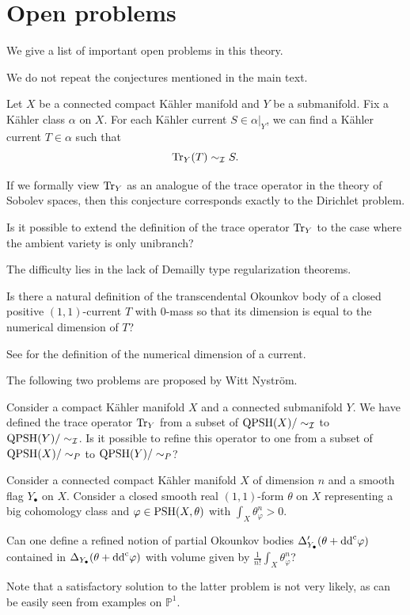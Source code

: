 \section*{Open problems}
We give a list of important open problems in this theory.

We do not repeat the conjectures mentioned in the main text.

\begin{conjecture}\label{conj:exttracegeneral}
    Let $X$ be a connected compact K\"ahler manifold and $Y$ be a submanifold. Fix a K\"ahler class $\alpha$ on $X$. For each K\"ahler current $S\in \alpha|_Y$, we can find a K\"ahler current $T\in \alpha$ such that
    \[
    \operatorname{Tr}_Y(T)\sim_{\mathcal{I}}S.
    \]
\end{conjecture}
If we formally view $\operatorname{Tr}_Y$ as an analogue of the trace operator in the theory of Sobolev spaces, then this conjecture corresponds exactly to the Dirichlet problem.

\begin{problem}\label{prob:history:L209}
    Is it possible to extend the definition of the trace operator $\operatorname{Tr}_Y$ to the case where the ambient variety is only unibranch?
\end{problem}
The difficulty lies in the lack of Demailly type regularization theorems.


\begin{problem}\label{prob:history:L215}
    Is there a natural definition of the transcendental Okounkov body of a closed positive $(1,1)$-current $T$ with $0$-mass so that its dimension is equal to the numerical dimension of $T$?
\end{problem}
See \cite{Cao14} for the definition of the numerical dimension of a current.

The following two problems are proposed by Witt Nystr\"om.
\begin{problem}\label{prob:history:L221}
    Consider a compact K\"ahler manifold $X$ and a connected submanifold $Y$. We have defined the trace operator $\operatorname{Tr}_Y$ from a subset of $\mathrm{QPSH}(X)/\sim_\mathcal{I}$ to $\mathrm{QPSH}(Y)/\sim_\mathcal{I}$. Is it possible to refine this operator to one from a subset of $\mathrm{QPSH}(X)/\sim_P$ to $\mathrm{QPSH}(Y)/\sim_P$?
\end{problem}

\begin{problem}\label{prob:history:L225}
    Consider a connected compact K\"ahler manifold $X$ of dimension $n$ and a smooth flag $Y_{\bullet}$ on $X$. Consider a closed smooth real $(1,1)$-form $\theta$ on $X$ representing a big cohomology class and $\varphi\in \mathrm{PSH}(X,\theta)$ with $\int_X \theta_{\varphi}^n>0$.

    Can one define a refined notion of partial Okounkov bodies $\Delta'_{Y_{\bullet}}(\theta+\mathrm{dd}^{\mathrm{c}}\varphi)$ contained in $\Delta_{Y_{\bullet}}(\theta+\mathrm{dd}^{\mathrm{c}}\varphi)$ with volume given by $\frac{1}{n!}\int_X \theta_{\varphi}^n$?
\end{problem}
Note that a satisfactory solution to the latter problem is not very likely, as can be easily seen from examples on $\mathbb{P}^1$.


